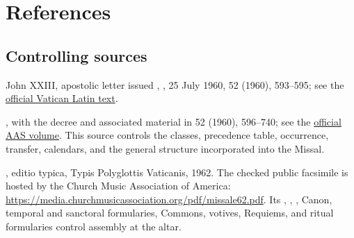 \section{References}

\subsection{Controlling sources}

{\footnotesize
\begin{description}[style=multiline,leftmargin=0.28\linewidth,labelwidth=0.25\linewidth,itemsep=0.2em,topsep=0.2em,parsep=0pt]
\item[Promulgation] John XXIII, apostolic letter issued , , 25 July 1960,  52 (1960), 593--595; see the \href{https://www.vatican.va/content/john-xxiii/la/motu_proprio/documents/hf_j-xxiii_motu-proprio_19600725_rubricarum-instructum.html}{official Vatican Latin text}.
\item[Rubrical code] , with the decree and associated material in  52 (1960), 596--740; see the \href{https://www.vatican.va/archive/aas/documents/AAS-52-1960-ocr.pdf}{official AAS volume}.  This source controls the classes, precedence table, occurrence, transfer, calendars, and the general structure incorporated into the Missal.
\item[Typical Missal] , editio typica, Typis Polyglottis Vaticanis, 1962.  The checked public facsimile is hosted by the Church Music Association of America: \url{https://media.churchmusicassociation.org/pdf/missale62.pdf}.  Its , , , Canon, temporal and sanctoral formularies, Commons, votives, Requiems, and ritual formularies control assembly at the altar.
\end{description}
}
